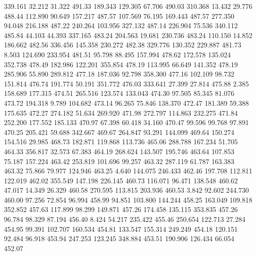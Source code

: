  339.161   32.212   31.322       491.33
 189.343  129.305   67.706       490.03
 310.368   13.432   29.776       488.44
 112.890   90.649  157.217       487.57
 107.569   76.195  169.443       487.57
 277.350   94.048  216.188       487.22
 240.264  103.956  327.132       487.14
 226.904   75.536  340.112       485.84
  44.103   44.393  337.165       483.24
 204.563   19.681  230.736       483.24
 110.150   14.852  186.662       482.56
 336.456  145.358  230.272       482.38
 329.776  130.352  229.887       481.73
   8.503  124.690  233.954       481.51
  95.798   88.495  157.994       478.62
 172.578  135.024  352.738       478.49
 182.986  122.201  355.854       478.19
 113.995   66.649  141.352       478.19
 285.906   55.890  289.812       477.18
 187.036   92.798  358.300       477.16
 102.109   98.732  151.814       476.74
 191.774   50.191  351.772       476.03
 333.641   27.399   27.814       475.88
   2.385  158.689  177.315       474.51
 265.516  123.574  133.043       474.30
  97.505   85.345   81.076       473.72
 194.318    9.789  104.682       473.14
  96.265   75.846  138.370       472.47
 181.389   59.388  175.635       472.27
 274.182   51.634  269.920       471.98
 272.797  114.863  232.275       471.84
 252.200  177.552  185.133       470.97
  67.398   60.418   34.160       470.47
  99.596   99.768   97.891       470.25
 205.421   59.688  342.667       469.67
 264.847   93.291  144.099       469.64
 150.274  154.516   29.985       468.73
 182.871  119.868  113.736       465.06
 288.788  167.234   51.705       464.33
 356.817   32.573   67.383       464.19
 268.624  143.507  195.746       463.64
 107.853   75.187  157.224       463.42
 253.819  101.696   99.257       463.32
 287.119   61.787  163.383       463.32
  75.866   79.977  124.946       463.25
   4.640  144.075  246.433       462.46
 197.708  112.811  122.019       462.02
 355.549  147.198  226.145       460.73
 116.071   96.471  138.548       460.62
  47.017   14.349   26.329       460.58
 270.595  113.815  203.936       460.53
   3.842   92.602  244.730       460.00
  97.256   72.854   96.994       458.99
  94.851  103.800  144.244       458.25
 163.049  109.818  352.852       457.63
 117.899   98.299  149.871       457.26
 174.458  135.115  353.835       457.26
  96.784   98.329   87.194       456.40
   8.424   54.217  235.422       455.46
 250.654  122.713   27.284       454.95
  99.391  102.707  160.534       454.81
 133.547  155.314  249.249       454.18
 120.151   92.484   96.918       453.94
 247.253  123.245  348.884       453.51
 190.906  126.434   66.054       452.07
